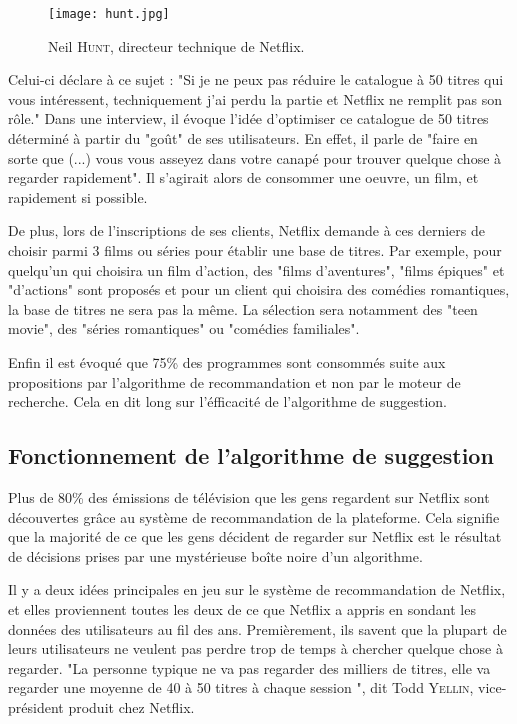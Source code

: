 \documentclass[a4paper,14pt]{extreport}
\begin{document}
\begin{figure}[ht]
 \begin{center}
  \texttt{[image: hunt.jpg]}
 \end{center}
    \caption{Neil \textsc{Hunt}, directeur technique de Netflix.}
 \label{hunt}
\end{figure}

Celui-ci déclare à ce sujet : "Si je ne peux pas réduire le catalogue à 50 titres qui vous intéressent, techniquement j'ai perdu la partie et Netflix ne remplit pas son rôle." Dans une interview, il évoque l'idée d'optimiser ce catalogue de 50 titres déterminé à partir du "goût" de ses utilisateurs. En effet, il parle de "faire en sorte que (...) vous vous asseyez dans votre canapé pour trouver quelque chose à regarder rapidement". Il s'agirait alors de consommer une oeuvre, un film, et rapidement si possible.

De plus, lors de l'inscriptions de ses clients, Netflix demande à ces derniers de choisir parmi 3 films ou séries pour établir une base de titres. Par exemple, pour quelqu'un qui choisira un film d'action, des "films d'aventures", "films épiques" et "d'actions" sont proposés et pour un client qui choisira des comédies romantiques, la base de titres ne sera pas la même. La sélection sera notamment des "teen movie", des "séries romantiques" ou "comédies familiales".

Enfin il est évoqué que 75\% des programmes sont consommés suite aux propositions par l'algorithme de recommandation et non par le moteur de recherche. Cela en dit long sur l'éfficacité de l’algorithme de suggestion.

\subsection{Fonctionnement de l’algorithme de suggestion}

Plus de 80\% des émissions de télévision que les gens regardent sur Netflix sont découvertes grâce au système de recommandation de la plateforme. Cela signifie que la majorité de ce que les gens décident de regarder sur Netflix est le résultat de décisions prises par une mystérieuse boîte noire d'un algorithme.

Il y a deux idées principales en jeu sur le système de recommandation de Netflix, et elles proviennent toutes les deux de ce que Netflix a appris en sondant les données des utilisateurs au fil des ans. Premièrement, ils savent que la plupart de leurs utilisateurs ne veulent pas perdre trop de temps à chercher quelque chose à regarder. "La personne typique ne va pas regarder des milliers de titres, elle va regarder une moyenne de 40 à 50 titres à chaque session ", dit Todd \textsc{Yellin}, vice-président produit chez Netflix.
\end{document}
